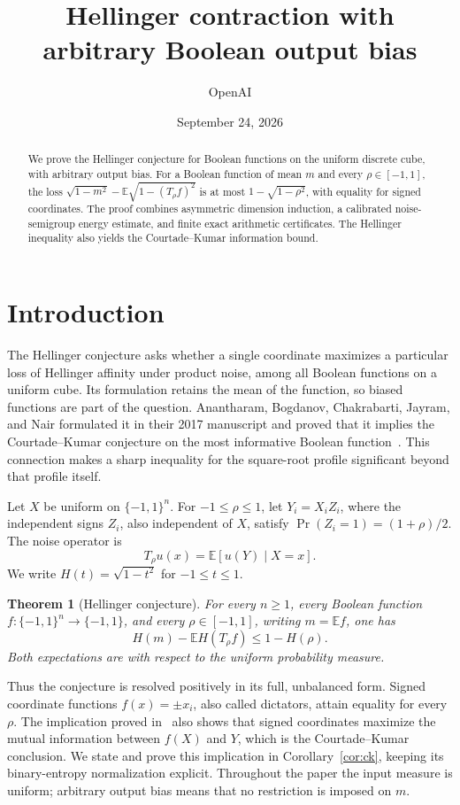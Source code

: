 \documentclass[11pt]{article}
\title{Hellinger contraction with arbitrary Boolean output bias}
\author{OpenAI}
\date{September 24, 2026}
\numberwithin{equation}{section}
\newtheorem{theorem}{Theorem}[section]
\theoremstyle{definition}
\theoremstyle{remark}
\newcommand{\E}{\mathbb E}
\begin{document}
\maketitle
\begin{abstract}
We prove the Hellinger conjecture for Boolean functions on the uniform discrete cube, with arbitrary output bias. For a Boolean function of mean $m$ and every $\rho\in[-1,1]$, the loss
$\sqrt{1-m^2}-\E\sqrt{1-(T_\rho f)^2}$ is at most
$1-\sqrt{1-\rho^2}$, with equality for signed coordinates.
The proof combines asymmetric dimension induction, a calibrated noise-semigroup energy estimate, and finite exact arithmetic certificates.
The Hellinger inequality also yields the Courtade--Kumar information bound.
\end{abstract}

\section{Introduction}\label{sec:introduction}
The Hellinger conjecture asks whether a single coordinate maximizes a particular loss of Hellinger affinity under product noise, among all Boolean functions on a uniform cube. Its formulation retains the mean of the function, so biased functions are part of the question. Anantharam, Bogdanov, Chakrabarti, Jayram, and Nair formulated it in their 2017 manuscript and proved that it implies the Courtade--Kumar conjecture on the most informative Boolean function~\cite{ABCJN,CK14}. This connection makes a sharp inequality for the square-root profile significant beyond that profile itself.

Let \(X\) be uniform on \(\{-1,1\}^n\). For \(-1\le\rho\le1\), let
\(Y_i=X_i Z_i\), where the independent signs \(Z_i\), also independent of \(X\), satisfy
\(\Pr(Z_i=1)=(1+\rho)/2\). The noise operator is
\[
T_\rho u(x)=\E[u(Y)\mid X=x].
\]
We write \(H(t)=\sqrt{1-t^2}\) for \(-1\le t\le1\).

\begin{theorem}[Hellinger conjecture]\label{thm:main}
For every \(n\ge1\), every Boolean function
\(f:\{-1,1\}^n\to\{-1,1\}\), and every \(\rho\in[-1,1]\), writing \(m=\E f\), one has
\begin{equation}\label{eq:main}
H(m)-\E H(T_\rho f)\le1-H(\rho).
\end{equation}
Both expectations are with respect to the uniform probability measure.
\end{theorem}

Thus the conjecture is resolved positively in its full, unbalanced form.
Signed coordinate functions \(f(x)=\pm x_i\), also called dictators,
attain equality for every \(\rho\).
The implication proved in~\cite[Proposition~1]{ABCJN} also shows that signed
coordinates maximize the mutual information between \(f(X)\) and \(Y\),
which is the Courtade--Kumar conclusion. We state and prove this implication
in Corollary~\ref{cor:ck}, keeping its binary-entropy normalization explicit.
Throughout the paper the input measure is uniform; arbitrary output bias
means that no restriction is imposed on $m$.
\end{document}
